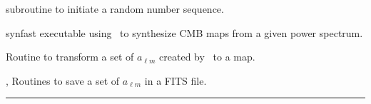 \begin{related}
  \begin{sulist}{} %
  \item[\htmlref{rand\_init}{sub:rand_init}] subroutine to initiate a random number sequence. 
  \item[synfast] executable using \thedocid\ to synthesize CMB maps from a given
  power spectrum.
  \item[\htmlref{alm2map}{sub:alm2map}] Routine to transform a set of $a_{\ell m}$ created by \thedocid\ to a \healpix map.
  \item[\htmlref{alms2fits}{sub:alms2fits}, \htmlref{dump\_alms}{sub:dump_alms}]
  Routines to save a set of $a_{\ell m}$ in a FITS file.  
  \end{sulist}
\end{related}

\rule{\hsize}{2mm}

\newpage
